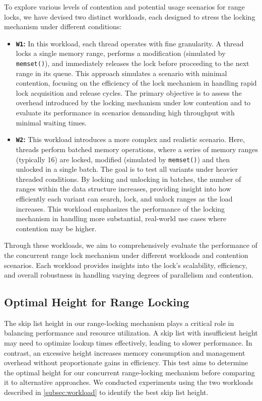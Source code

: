 To explore various levels of contention and potential usage scenarios for range locks, we have devised two distinct workloads, each designed to stress the locking mechanism under different conditions:

\begin{itemize} 
    \item \textbf{\texttt{W1}:} In this workload, each thread operates with fine granularity. 
    A thread locks a single memory range, performs a modification (simulated by \texttt{memset()}), and immediately releases the lock before proceeding to the next range in its queue. 
    This approach simulates a scenario with minimal contention, focusing on the efficiency of the lock mechanism in handling rapid lock acquisition and release cycles. 
    The primary objective is to assess the overhead introduced by the locking mechanism under low contention and to evaluate its performance in scenarios demanding high throughput with minimal waiting times.
    
    \item \textbf{\texttt{W2}:} This workload introduces a more complex and realistic scenario. 
    Here, threads perform batched memory operations, where a series of memory ranges (typically 16) are locked, modified (simulated by \texttt{memset()}) and then unlocked in a single batch. 
    The goal is to test all variants under heavier threaded conditions. 
    By locking and unlocking in batches, the number of ranges within the data structure increases, providing insight into how efficiently each variant can search, lock, and unlock ranges as the load increases. 
    This workload emphasizes the performance of the locking mechanism in handling more substantial, real-world use cases where contention may be higher.
\end{itemize}

Through these workloads, we aim to comprehensively evaluate the performance of the concurrent range lock mechanism under different workloads and contention scenarios. 
Each workload provides insights into the lock's scalability, efficiency, and overall robustness in handling varying degrees of parallelism and contention.

\subsection{Optimal Height for Range Locking}

The skip list height in our range-locking mechanism plays a critical role in balancing performance and resource utilization. 
A skip list with insufficient height may need to optimize lookup times effectively, leading to slower performance. In contrast, an excessive height increases memory consumption and management overhead without proportionate gains in efficiency. 
This test aims to determine the optimal height for our concurrent range-locking mechanism before comparing it to alternative approaches. 
We conducted experiments using the two workloads described in \ref{subsec:workload} to identify the best skip list height.

